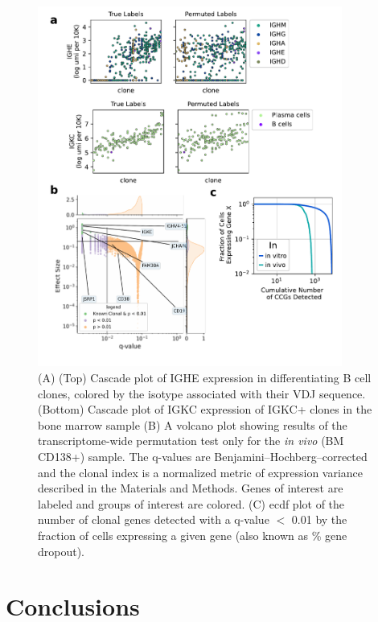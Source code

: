 \begin{figure}[hbt!]
\centering
\includegraphics[width=10cm, keepaspectratio]{figs/InVitro/figS4_bcd_small.pdf}
\caption[Analysis of persistent \textit{in vivo} transcriptional programs.]{(A) (Top) Cascade plot of IGHE expression in differentiating B cell clones, colored by the isotype associated with their VDJ sequence. (Bottom) Cascade plot of IGKC expression of IGKC+ clones in the bone marrow sample (B) A volcano plot showing results of the transcriptome-wide permutation test only for the \textit{in vivo} (BM CD138+) sample. The q-values are Benjamini–Hochberg–corrected and the clonal index is a normalized metric of expression variance described in the Materials and Methods. Genes of interest are labeled and groups of interest are colored. (C) ecdf plot of the number of clonal genes detected with a q-value $<$ 0.01 by the fraction of cells expressing a given gene (also known as \% gene dropout).}
\label{fig:paper2_fig_s4}
\end{figure}

\section{Conclusions}

